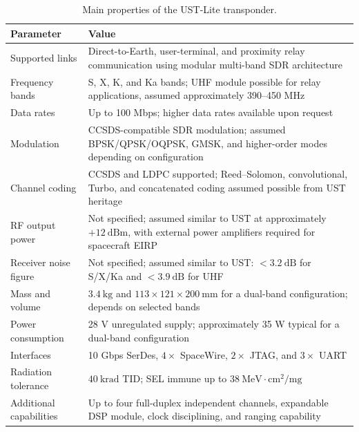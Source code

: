 \begin{table}[H]
\centering
\caption{Main properties of the UST-Lite transponder.}
\label{tab:ust_lite_transponder_specs}
\scriptsize
\renewcommand{\arraystretch}{1.10}
\setlength{\tabcolsep}{3pt}
\begin{tabular}{|p{3.6cm}|p{8.9cm}|}
\hline
\textbf{Parameter} & \textbf{Value} \\
\hline
Supported links & Direct-to-Earth, user-terminal, and proximity relay communication using modular multi-band SDR architecture \\
\hline
Frequency bands & S, X, K, and Ka bands; UHF module possible for relay applications, assumed approximately 390--450 MHz \\
\hline
Data rates & Up to 100 Mbps; higher data rates available upon request \\
\hline
Modulation & CCSDS-compatible SDR modulation; assumed BPSK/QPSK/OQPSK, GMSK, and higher-order modes depending on configuration \\
\hline
Channel coding & CCSDS and LDPC supported; Reed--Solomon, convolutional, Turbo, and concatenated coding assumed possible from UST heritage \\
\hline
RF output power & Not specified; assumed similar to UST at approximately \(+12~\mathrm{dBm}\), with external power amplifiers required for spacecraft EIRP \\
\hline
Receiver noise figure & Not specified; assumed similar to UST: \(<3.2~\mathrm{dB}\) for S/X/Ka and \(<3.9~\mathrm{dB}\) for UHF \\
\hline
Mass and volume & \(3.4~\mathrm{kg}\) and \(113 \times 121 \times 200~\mathrm{mm}\) for a dual-band configuration; depends on selected bands \\
\hline
Power consumption & 28 V unregulated supply; approximately 35 W typical for a dual-band configuration \\
\hline
Interfaces & 10 Gbps SerDes, \(4\times\) SpaceWire, \(2\times\) JTAG, and \(3\times\) UART \\
\hline
Radiation tolerance & \(40~\mathrm{krad}\) TID; SEL immune up to \(38~\mathrm{MeV\cdot cm^2/mg}\) \\
\hline
Additional capabilities & Up to four full-duplex independent channels, expandable DSP module, clock disciplining, and ranging capability \\
\hline
\end{tabular}
\end{table}
